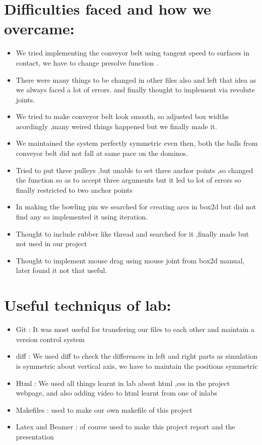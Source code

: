 \documentclass[10pt,a4paper]{article}
\begin{document}
\section*{\textbf{Difficulties faced and how we overcame:}}
\begin{itemize}[itemsep = -0.75 mm, leftmargin=*]
 \item We tried implementing the conveyor belt using tangent speed to surfaces
 in contact, we have to change presolve function .\cite{conveyors}
 \item There were many things to be
 changed in other files also and left that idea as we always faced a lot of
 errors. and finally thought to implement via revolute joints.
 \item We tried to make conveyor belt look smooth, so adjusted box widths
 acordingly ,many weired things happened but we finally made it.
 \item We maintained the system perfectly symmetric even then, both the balls
 from conveyor belt did not fall at same pace on the dominos.
 \item Tried to put three pulleys ,but unable to set three anchor points ,so
 changed the function so as to accept three arguments but it led to lot of
 errors so finally restricted to two anchor points
 \item In making the bowling pin we searched for creating arcs in box2d but did
 not find any so implemented it using iteration. 
 \item Thought to include rubber like thread and searched for it ,finally made
 but not used in our project \cite{rubberthread}
 \item Thought to implement mouse drag using mouse joint from box2d manual,
 later found it not that useful.\cite{manual}
\end{itemize}
\vspace{-10pt}

\section*{\textbf{Useful techniqus of lab:}}
 \begin{itemize}[itemsep = -0.75 mm, leftmargin=*]
  \item Git : It was most useful for transfering our files to each other and
  maintain a version control system
  \item diff : We used diff to check the differences in left and right parts as
  simulation is symmetric about vertical axis, we have to maintain the positions
  symmetric
  \item Html : We used all things learnt in lab about html ,css in the project
  webpage, and also adding video to html learnt from one of inlabs
  \item Makefiles : used to make our own makefile of this project
  \item Latex and Beamer : of course used to make this project report and the
  presentation
 \end{itemize}
\vspace{-10pt}
\end{document}

